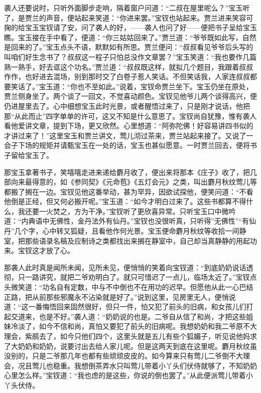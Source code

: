 \begin{parag}
    袭人还要说时，只听外面脚步走响，隔着窗户问道：“二叔在屋里呢么？”宝玉听了，是贾兰的声音，便站起来笑道：“你进来罢。”宝钗也站起来。贾兰进来笑容可掬的给宝玉宝钗请了安，问了袭人的好，——袭人也问了好——便把书子呈给宝玉瞧。宝玉接在手中看了，便道：“你三姑姑回来了。”贾兰道：“爷爷既如此写，自然是回来的了。”宝玉点头不语，默默如有所思。贾兰便问：“叔叔看见爷爷后头写的叫咱们好生念书了？叔叔这一程子只怕总没作文章罢？”宝玉笑道：“我也要作几篇熟一熟手，好去诓这个功名。”贾兰道：“叔叔既这样，就拟几个题目，我跟着叔叔作作，也好进去混场，别到那时交了白卷子惹人笑话。不但笑话我，人家连叔叔都要笑话了。”宝玉道：“你也不至如此。”说着，宝钗命贾兰坐下。宝玉仍坐在原处，贾兰侧身坐了。两个谈了一回文，不觉喜动颜色。宝钗见他爷儿两个谈得高兴，便仍进屋里去了。心中细想宝玉此时光景，或者醒悟过来了，只是刚才说话，他把那“从此而止”四字单单的许可，这又不知是什么意思了。宝钗尚自犹豫，惟有袭人看他爱讲文章，提到下场，更又欣然。心里想道：“阿弥陀佛！好容易讲四书似的才讲过来了！”这里宝玉和贾兰讲文，莺儿沏过茶来，贾兰站起来接了。又说了一会子下场的规矩并请甄宝玉在一处的话，宝玉也甚似愿意。一时贾兰回去，便将书子留给宝玉了。
\end{parag}


\begin{parag}
    那宝玉拿著书子，笑嘻嘻走进来递给麝月收了，便出来将那本《庄子》收了，把几部向来最得意的，如《参同契》《元命苞》《五灯会元》之类，叫出麝月秋纹莺儿等都搬了搁在一边。宝钗见他这番举动，甚为罕异，因欲试探他，便笑问道：“不看他倒是正经，但又何必搬开呢。”宝玉道：“如今才明白过来了。这些书都算不得什么，我还要一火焚之，方为干净。”宝钗听了更欣喜异常。只听宝玉口中微吟道：“内典语中无佛性，金丹法外有仙丹。”宝钗也没很听真，只听得”无佛性”“有仙丹”几个字，心中转又狐疑，且看他作何光景。宝玉便命麝月秋纹等收拾一间静室，把那些语录名稿及应制诗之类都找出来搁在静室中，自己却当真静静的用起功来。宝钗这才放了心。
\end{parag}


\begin{parag}
    那袭人此时真是闻所未闻，见所未见，便悄悄的笑着向宝钗道：“到底奶奶说话透彻，只一路讲究，就把二爷劝明白了。就只可惜迟了一点儿，临场太近了。”宝钗点头微笑道：“功名自有定数，中与不中倒也不在用功的迟早。但愿他从此一心巴结正路，把从前那些邪魔永不沾染就是好了。”说到这里，见房里无人，便悄说道：“这一番悔悟回来固然很好，但只一件，怕又犯了前头的旧病，和女孩儿们打起交道来，也是不好。”袭人道：“奶奶说的也是。二爷自从信了和尚，才把这些姐妹冷淡了，如今不信和尚，真怕又要犯了前头的旧病呢。我想奶奶和我二爷原不大理会，紫鹃去了，如今只他们四个，这里头就是五儿有些个狐媚子，听见说他妈求了大奶奶和奶奶，说要讨出去给人家儿呢。但是这两天到底在这里呢。麝月秋纹虽没别的，只是二爷那几年也都有些顽顽皮皮的。如今算来只有莺儿二爷倒不大理会，况且莺儿也稳重。我想倒茶弄水只叫莺儿带着小丫头们伏侍就够了，不知奶奶心里怎么样。”宝钗道：“我也虑的是这些，你说的倒也罢了。”从此便派莺儿带着小丫头伏侍。
\end{parag}


